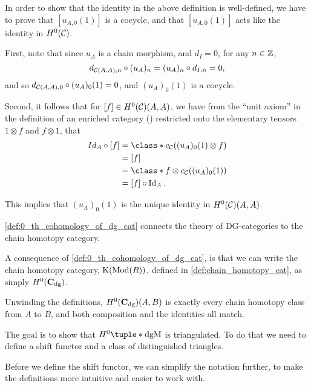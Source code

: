 \begin{remark}
    In order to show that the identity in the above definition is well-defined, we have to prove that \( [u_{A, 0} (1)] \) is a cocycle, and that \( [u_{A, 0} (1)] \) acts like the identity in \( H^0({\mathcal{C}}) \).

    First, note that since \( u_A \) is a chain morphism, and \( d_I = 0 \), for any \( n \in {\mathbb{Z}} \),
    \[
        d_{{\mathcal{C}}(A, A), n} \circ (u_A)_n = (u_A)_n \circ d_{I, n} = 0,
    \]
    and so \( d_{{\mathcal{C}}(A, A), 0} \circ (u_A)_0 (1) = 0 \), and \( (u_A)_0 (1) \) is a cocycle.

    Second, it follows that for \( [f] \in H^0({\mathcal{C}})(A, A) \), we have from the ``unit axiom'' in the definition of an enriched category (\cite[Diagram 6.10]{Borceux_1994}) restricted onto the elementary tensors \( 1 \otimes f \) and \( f \otimes 1 \), that
    \begin{align*}
        Id_A \circ [f] &= \class*{ c_{\Cc}((u_A)_0 (1) \otimes f) } \\
        &= [f] \\
        &= \class*{ f \otimes c_{\Cc}((u_A)_0 (1)) } \\
        &= [f] \circ \Id_A.
    \end{align*}

    This implies that \( (u_A)_0 (1) \) is the unique identity in \( H^0({\mathcal{C}})(A, A) \).
\end{remark}

\autoref{def:0_th_cohomology_of_dg_cat} connects the theory of DG-categories to the chain homotopy category.

\begin{remark}
    A consequence of \autoref{def:0_th_cohomology_of_dg_cat}, is that we can write the chain homotopy category, \( \operatorname{K}(\operatorname{Mod}(R)) \), defined in \autoref{def:chain_homotopy_cat}, as simply \( H^0(\operatorname{\mathbf{C}}_{\operatorname{dg}}) \).
    
    Unwinding the definitions, \( H^0(\operatorname{\mathbf{C}}_{\operatorname{dg}})(A, B) \) is exactly every chain homotopy class from \( A \) to \( B \), and both composition and the identities all match.
\end{remark}

The goal is to show that \( H^0\tuple*{\dgM} \) is triangulated. To do that we need to define a shift functor and a class of distinguished triangles.

Before we define the shift functor, we can simplify the notation further, to make the definitions more intuitive and easier to work with.


